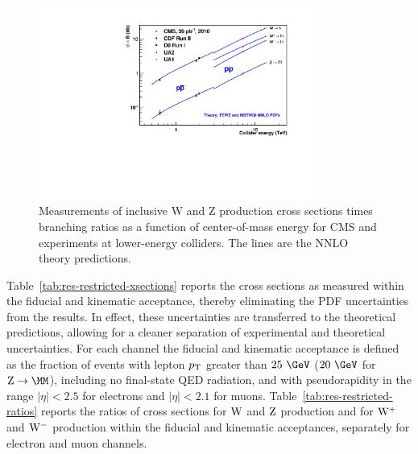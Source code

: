 \begin{figure}
\begin{center}
\includegraphics[width=0.8\textwidth]{figs/WZsigmas.pdf}
\caption[.]{\label{fig:WZsigmas}
Measurements of inclusive W and Z production cross sections
times branching ratios as a function of center-of-mass energy for CMS and experiments
at lower-energy colliders. The lines are the NNLO theory predictions.
}
\end{center}
\end{figure}





\par
Table~\ref{tab:res-restricted-xsections} reports the cross sections 
as measured within the fiducial and kinematic acceptance, thereby eliminating the PDF uncertainties
from the results. In effect, these
uncertainties are transferred to the theoretical predictions,
allowing for a cleaner separation of experimental and
theoretical uncertainties.
For each channel the fiducial and kinematic acceptance
is defined as the fraction of events with lepton $p_{\mathrm{T}}$ greater than $25~\GeV$
($20~\GeV$ for $\Zmm$), including no final-state QED radiation,
and with pseudorapidity in the range $|\eta|<2.5$ for electrons
and $|\eta|<2.1$ for muons.
Table~\ref{tab:res-restricted-ratios} reports the 
ratios of cross sections for $\mathrm{W}$ and $\mathrm{Z}$ production and for $\mathrm{W}^+$ and $\mathrm{W}^-$ production
within the fiducial and kinematic acceptances, separately for electron
and muon channels.


